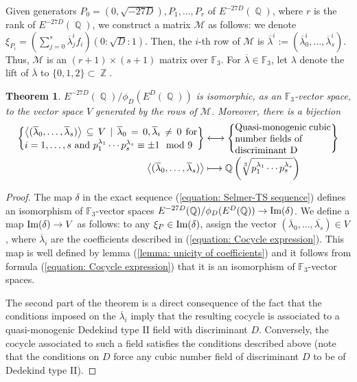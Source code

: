 \documentclass[oneside]{amsart}
\newcommand{\FF}{\mathbb{F}}
\newcommand{\scprod}[1]{\left\langle #1 \right\rangle}
\newcommand{\embrace}[3]{\left#1 #3 \right#2}
\newcommand{\lpar}[1]{\embrace{(}{)}{#1}}
\newcommand{\im}{\textnormal{Im}}
\DeclareMathOperator{\QQ}{\mathbb{Q}}
\DeclareMathOperator{\ZZ}{\mathbb{Z}}
\newtheorem{theorem}[X]{Theorem}
\theoremstyle{definition}
\begin{document}
Given generators $P_0 = (0, \sqrt{-27D}), P_1, \dots, P_{r}$ of $E^{-27D}(\QQ)$, where $r$ is the rank of $E^{-27D}(\QQ)$, we construct a matrix $\mathcal{M}$ as follows: we denote $\xi_{P_i} = (\sum_{j = 0}^{s}\overline{\lambda}_j^if_i)(0:\sqrt{D}:1)$. Then, the $i$-th row of $\mathcal{M}$ is $\overline{\lambda}^i := (\overline{\lambda}_0^i, \dots, \overline{\lambda}_{s}^i)$. Thus, $\mathcal{M}$ is an $(r + 1)\times(s + 1)$ matrix over $\mathbb{F}_3$. For $\overline{\lambda} \in \mathbb{F}_3$, let $\lambda$ denote the lift of $\overline{\lambda}$ to $\{0,1,2\} \subset \ZZ$. 
\begin{theorem}
    \label{theorem: Iso Dedekind II}
    $E^{-27D}(\QQ)/\phi_D(E^D(\QQ))$ is isomorphic, as an $\FF_3$-vector space, to the vector space $V$ generated by the rows of $\mathcal{M}$. Moreover, there is a bijection
    \begin{align*}
        \left\{\parbox{18em}{$\scprod{(\overline{\lambda}_0, \dots, \overline{\lambda}_{s})}\subseteq V \ | \ \overline{\lambda}_0 = 0, \overline{\lambda}_i \neq 0$ \textnormal{for} $i = 1, \dots, s \textnormal{ and }p_1^{\lambda_1}\cdots p_{s}^{\lambda_{s}}\equiv\pm 1\mod 9$}\right\}&\longleftrightarrow
        \left\{\parbox{10em}{\textnormal{Quasi-monogenic cubic number fields of\\ discriminant }D}\right\}\\
        \scprod{(\overline{\lambda}_0, \dots, \overline{\lambda}_{s})}&\longmapsto\QQ\lpar{\sqrt[3]{p_1^{\lambda_1}\cdots p_{s}^{\lambda_{s}}}}
    \end{align*}   
\end{theorem}
\begin{proof}
    The map $\delta$ in the exact sequence (\ref{equation: Selmer-TS sequence}) defines an isomorphism of $\mathbb{F}_3$-vector spaces $E^{-27D}(\QQ)/\phi_D(E^D(\QQ))\to \im(\delta)$. We define a map $\im(\delta) \to V$ as follows: to any $\xi_P \in \im(\delta)$, assign the vector $(\overline{\lambda}_0, \dots, \overline{\lambda_s}) \in V$, where $\overline{\lambda}_i$ are the coefficients described in (\ref{equation: Cocycle expression}). This map is well defined by lemma (\ref{lemma: unicity of coefficients}) and it follows from formula (\ref{equation: Cocycle expression}) that it is an isomorphism of $\mathbb{F}_3$-vector spaces.
    
    The second part of the theorem is a direct consequence of the fact that the conditions imposed on the $\overline{\lambda}_i$ imply that the resulting cocycle is associated to a quasi-monogenic Dedekind type II field with discriminant $D$. Conversely, the cocycle associated to such a field satisfies the conditions described above (note that the conditions on $D$ force any cubic number field of discriminant $D$ to be of Dedekind type II).  
\end{proof}
\end{document}

